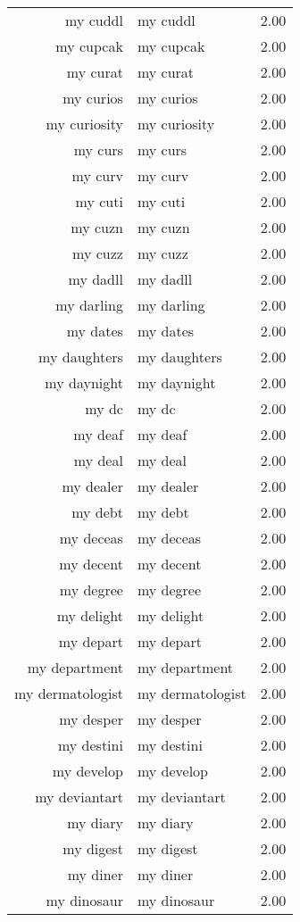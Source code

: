 \begin{table}[ht]
\begin{tabular}{rlr}
  my cuddl & my cuddl & 2.00 \\ 
  my cupcak & my cupcak & 2.00 \\ 
  my curat & my curat & 2.00 \\ 
  my curios & my curios & 2.00 \\ 
  my curiosity & my curiosity & 2.00 \\ 
  my curs & my curs & 2.00 \\ 
  my curv & my curv & 2.00 \\ 
  my cuti & my cuti & 2.00 \\ 
  my cuzn & my cuzn & 2.00 \\ 
  my cuzz & my cuzz & 2.00 \\ 
  my dadll & my dadll & 2.00 \\ 
  my darling & my darling & 2.00 \\ 
  my dates & my dates & 2.00 \\ 
  my daughters & my daughters & 2.00 \\ 
  my daynight & my daynight & 2.00 \\ 
  my dc & my dc & 2.00 \\ 
  my deaf & my deaf & 2.00 \\ 
  my deal & my deal & 2.00 \\ 
  my dealer & my dealer & 2.00 \\ 
  my debt & my debt & 2.00 \\ 
  my deceas & my deceas & 2.00 \\ 
  my decent & my decent & 2.00 \\ 
  my degree & my degree & 2.00 \\ 
  my delight & my delight & 2.00 \\ 
  my depart & my depart & 2.00 \\ 
  my department & my department & 2.00 \\ 
  my dermatologist & my dermatologist & 2.00 \\ 
  my desper & my desper & 2.00 \\ 
  my destini & my destini & 2.00 \\ 
  my develop & my develop & 2.00 \\ 
  my deviantart & my deviantart & 2.00 \\ 
  my diary & my diary & 2.00 \\ 
  my digest & my digest & 2.00 \\ 
  my diner & my diner & 2.00 \\ 
  my dinosaur & my dinosaur & 2.00 \\ 

\end{tabular}
\end{table}

